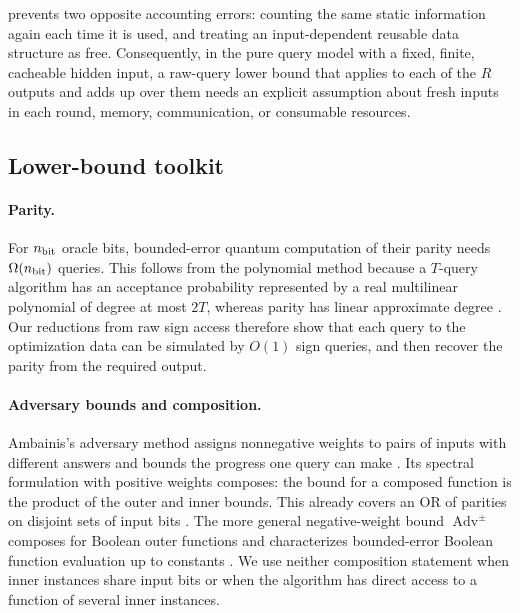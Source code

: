  prevents two opposite accounting
errors: counting the same static information again each time it is used, and
treating an input-dependent reusable data structure as free.  Consequently, in
the pure query model with a fixed, finite, cacheable hidden input, a raw-query
lower bound that applies to each of the $R$ outputs and adds up over them needs
an explicit assumption about fresh inputs in each round, memory,
communication, or consumable resources.

\subsection{Lower-bound toolkit}
\label{sec:prelim-lower-bound-tools}

\paragraph{Parity.}
For $n_{\rm bit}$ oracle bits, bounded-error quantum computation of their
parity needs $\Omega(n_{\rm bit})$ queries.  This follows from the polynomial
method because a
$T$-query algorithm has an acceptance probability represented by a real
multilinear polynomial of degree at most $2T$, whereas parity has linear
approximate degree \cite{beals2001-quantum-lower-bounds-by-polynomials}.  Our
reductions from raw sign access therefore show that each query to the
optimization data can be simulated by $O(1)$ sign queries, and then recover
the parity from the required output.

\paragraph{Adversary bounds and composition.}
Ambainis's adversary method assigns nonnegative weights to pairs of inputs
with different answers and bounds the progress one query can make
\cite{ambainis2002-quantum-lower-bounds-by-quantum}.  Its spectral
formulation with positive weights composes: the bound for a composed function
is the product of the outer and inner bounds.  This already covers an OR of
parities on disjoint sets of input bits
\cite{hyer2005-tight-adversary-bounds-for-composite}.  The more general
negative-weight bound $\operatorname{Adv}^{\pm}$ composes for Boolean outer functions and
characterizes bounded-error Boolean function evaluation up to constants
\cite{lee2011-quantum-query-complexity-of-state,reichardt2011-reflections-for-quantum-query-algorithms}.
We use neither composition statement when inner instances share input bits
or when the algorithm has direct access to a function of several inner
instances.

